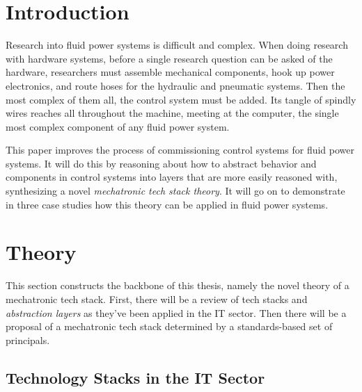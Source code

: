 \documentclass[english,12pt,a4paper,pdftex,eng,utf8]{aaltothesis}
\begin{document}
\cleardoublepage
\storeinipagenumber
{}
\setcounter{page}{1}


\section{Introduction}

\thispagestyle{empty}

Research into fluid power systems is difficult and complex.  When doing research with hardware systems, before a single research question can be asked of the hardware, researchers must assemble mechanical components, hook up power electronics, and route hoses for the hydraulic and pneumatic systems.  Then the most complex of them all, the control system must be added.  Its tangle of spindly wires reaches all throughout the machine, meeting at the computer, the single most complex component of any fluid power system.

This paper improves the process of commissioning control systems for fluid power systems.  It will do this by reasoning about how to abstract behavior and components in control systems into layers that are more easily reasoned with, synthesizing a novel {\it mechatronic tech stack theory}.  It will go on to demonstrate in three case studies how this theory can be applied in fluid power systems.

\clearpage


\section{Theory}

This section constructs the backbone of this thesis, namely the novel theory of a mechatronic tech stack.  First, there will be a review of tech stacks and {\it abstraction layers\/} as they've been applied in the IT sector.  Then there will be a proposal of a mechatronic tech stack determined by a standards-based set of principals.

\subsection{Technology Stacks in the IT Sector}
\end{document}

